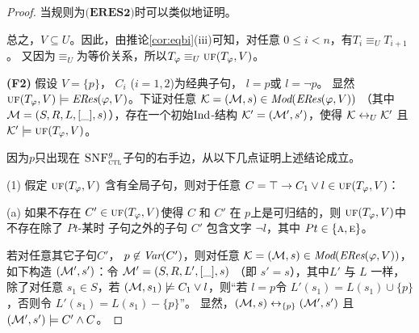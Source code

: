 \begin{proof}
	当规则为$\textbf{(ERES2)}$时可以类似地证明。
	
	总之，$V\subseteq U$。因此，由推论\ref{cor:eqbi}(iii)可知，对任意 $0 \leq i < n$，有$T_i \equiv_U T_{i+1}$。
	又因为$\equiv_U$为等价关系，所以$T_{\varphi} \equiv_U \textsc{uf}(T_\varphi,V)$。
	
	
	
	\textbf{(F2)} 假设 $V=\{p\}$， $C_i$ ($i=1,2$)为经典子句，  $l = p$或 $l = \neg p$。
	显然 $\textsc{uf}(T_\varphi,V) \models \emph{ERes}(\varphi,V)$。下证对任意 ${\cal K}=({\cal M}, s)\in \textit{Mod}(\emph{ERes}(\varphi,V))$ （其中${\cal M}=(S, R, L, [\_], s)$），存在一个初始$\textrm{Ind}$-结构 ${\cal K}'=({\cal M}', s')$，使得 ${\cal K} \leftrightarrow_{U} {\cal K}'$ 且 ${\cal K}' \models \textsc{uf}(T_\varphi,V)$。
	
	
	因为$p$只出现在 ${\textsc{SNF}_{\textsc{ctl}}^g}$子句的右手边，从以下几点证明上述结论成立。
	
	(1) 假定 $\textsc{uf}(T_\varphi,V)$ 含有全局子句，则对于任意 $C=\top\rightarrow C_1 \vee l \in \textsc{uf}(T_\varphi,V)$：
	
	(a) 如果不存在 $C'\in \textsc{uf}(T_\varphi,V)$使得 $C$ 和 $C'$ 在 $p$上是可归结的，则 $\textsc{uf}(T_\varphi,V)$中不存在除了 $Pt$-某时 子句之外的子句 $C'$ 包含文字 $\neg l$，其中 $Pt\in \{\textsc{a}, \textsc{e}\}$。
	
	若对任意其它子句$C'$， $p\not \in \textit{Var}(C')$，则对任意 ${\cal K}=({\cal M}, s)\in \textit{Mod}(\emph{ERes}(\varphi,V))$，如下构造 $({\cal M}',s')$：令 ${\cal M}'= (S, R, L',[\_], s)$ （即 $s'=s$），其中$L'$ 与 $L$ 一样，除了对任意 $s_1\in S$，若 $({\cal M}, s_1) \not \models C_1 \vee l$，则“若 $l=p$令 $L'(s_1) = L(s_1) \cup \{p\}$，否则令 $L'(s_1) = L(s_1) - \{p\}$”。
	显然，$({\cal M}, s) \leftrightarrow_{\{p\}} ({\cal M}', s')$ 且$({\cal M}', s') \models C' \wedge C$。
	

\end{proof}
